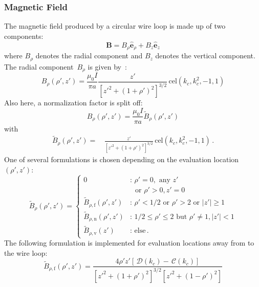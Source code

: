 \subsubsection{Magnetic Field}
The magnetic field produced by a circular wire loop is made up of two components:
\begin{equation}
  \mathbf{B} = B_\rho \hat{\mathbf{e}}_\rho + B_z \hat{\mathbf{e}}_z
\end{equation}
where $B_\rho$ denotes the radial component and $B_z$ denotes the vertical component.
The radial component~$B_\rho$ is given by~\cite{teal}:
\begin{equation}
  B_\rho(\rho', z')
  = \frac{\mu_0 I}{\pi a} \frac{z'}{\left[ z'^2 + (1 + \rho')^2 \right]^{3/2}} \,\mathrm{cel}(k_c, k_c^2, -1, 1)
\end{equation}
Also here, a normalization factor is split off:
\begin{equation}
  B_\rho(\rho', z') = \frac{\mu_0 I}{\pi a} \tilde{B}_\rho(\rho', z')
\end{equation}
with
\begin{align}
  \tilde{B}_\rho(\rho', z')
  =&\, \frac{z'}{\left[ z'^2 + (1 + \rho')^2 \right]^{3/2}} \,\mathrm{cel}(k_c, k_c^2, -1, 1) \, .
\end{align}
One of several formulations is chosen depending on the evaluation location~$(\rho', z')$:
\begin{equation}
  \tilde{B}_\rho(\rho', z')
  = \begin{cases}
      0                                 &:\, \rho' = 0, \textrm{ any } z' \\
                    ~                   &\, ~\textrm{ or } \rho' > 0, z' = 0 \\
      \tilde{B}_{\rho,\mathrm{f}} (\rho', z') &:\, \rho' < 1/2 \textrm{ or } \rho' > 2 \textrm{ or } |z'| \geq 1 \\
      \tilde{B}_{\rho,\mathrm{n}} (\rho', z') &:\, 1/2 \leq \rho' \leq 2 \textrm{ but } \rho' \neq 1, |z'| < 1 \\
      \tilde{B}_{\rho,\mathrm{v}} (z')        &:\, \textrm{else} \, .
    \end{cases} \label{eqn:cwl_B_rho_switchover}
\end{equation}
The following formulation is implemented for evaluation locations away from to the wire loop:
\begin{equation}
  \tilde{B}_{\rho,\mathrm{f}} (\rho', z')
  = \frac{4 \rho' z' \left[ \,\mathcal{D}(k_c) - \,\mathcal{C}(k_c) \right]}
         {\left[{z'}^2 + (1 + \rho')^2 \right]^{3/2} \left[{z'}^2 + (1 - \rho')^2 \right] } \label{eqn:cwl_B_rho_f}
\end{equation}
